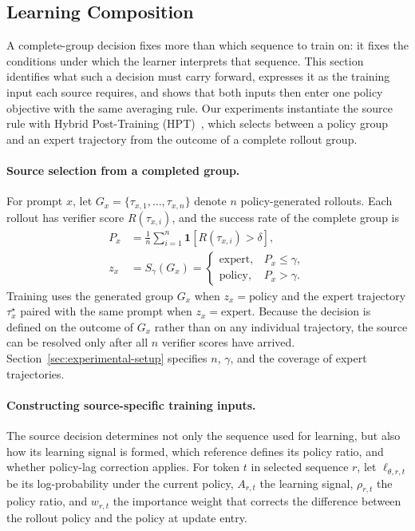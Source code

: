 \documentclass[letterpaper]{article}
\begin{document}
\subsection{Learning Composition}
\label{sec:learning-composition}

A complete-group decision fixes more than which sequence to train on: it fixes the conditions under which the learner interprets that sequence.
This section identifies what such a decision must carry forward, expresses it as the training input each source requires, and shows that both inputs then enter one policy objective with the same averaging rule.
Our experiments instantiate the source rule with Hybrid Post-Training (HPT)~\citep{lv2025hpt}, which selects between a policy group and an expert trajectory from the outcome of a complete rollout group.

\paragraph{Source selection from a completed group.}
For prompt $x$, let
$G_x=\{\tau_{x,1},\ldots,\tau_{x,n}\}$
denote $n$ policy-generated rollouts.
Each rollout has verifier score $R(\tau_{x,i})$, and the success rate of the complete group is
\begin{equation}
\begin{aligned}
P_x &=
\frac{1}{n}\sum_{i=1}^{n}
\mathbf{1}\!\left[R(\tau_{x,i})>\delta\right],\\
z_x &= S_\gamma(G_x)=
\begin{cases}
\mathrm{expert}, & P_x\le\gamma,\\
\mathrm{policy}, & P_x>\gamma.
\end{cases}
\end{aligned}
\label{eq:source-selection}
\end{equation}
Training uses the generated group $G_x$ when $z_x=\mathrm{policy}$ and the expert trajectory $\tau_x^\star$ paired with the same prompt when $z_x=\mathrm{expert}$.
Because the decision is defined on the outcome of $G_x$ rather than on any individual trajectory, the source can be resolved only after all $n$ verifier scores have arrived.
Section~\ref{sec:experimental-setup} specifies $n$, $\gamma$, and the coverage of expert trajectories.

\paragraph{Constructing source-specific training inputs.}
The source decision determines not only the sequence used for learning, but also how its learning signal is formed, which reference defines its policy ratio, and whether policy-lag correction applies.
For token $t$ in selected sequence $r$, let $\ell_{\theta,r,t}$ be its log-probability under the current policy, $A_{r,t}$ the learning signal, $\rho_{r,t}$ the policy ratio, and $w_{r,t}$ the importance weight that corrects the difference between the rollout policy and the policy at update entry.
\end{document}
